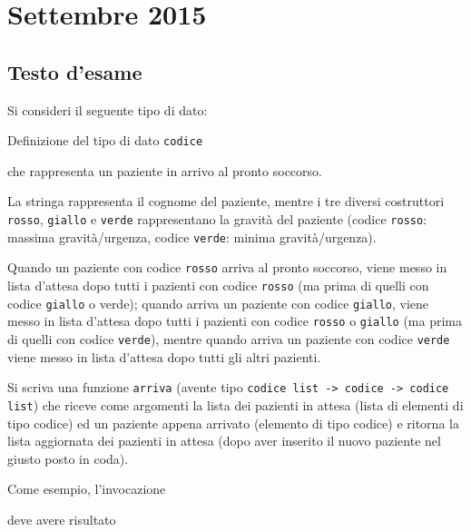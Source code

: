 \section{Settembre 2015}

\subsection{Testo d'esame}

Si consideri il seguente tipo di dato:

\begin{listing}[!h]
\caption[]{Definizione del tipo di dato \texttt{codice}}
\end{listing}
che rappresenta un paziente in arrivo al pronto soccorso.

\medskip
La stringa rappresenta il cognome del paziente, mentre i tre diversi costruttori \texttt{rosso}, \texttt{giallo} e \texttt{verde} rappresentano la gravità del paziente (codice \texttt{rosso}: massima gravità/urgenza, codice \texttt{verde}: minima gravità/urgenza).

\medskip
Quando un paziente con codice \texttt{rosso} arriva al pronto soccorso, viene messo in lista d'attesa dopo tutti i pazienti con codice \texttt{rosso} (ma prima di quelli con codice \texttt{giallo} o verde); quando arriva un paziente con codice \texttt{giallo}, viene messo in lista d'attesa dopo tutti i pazienti con codice \texttt{rosso} o \texttt{giallo} (ma prima di quelli con codice \texttt{verde}), mentre quando arriva un paziente con codice \texttt{verde} viene messo in lista d'attesa dopo tutti gli altri pazienti.

\medskip
Si scriva una funzione \texttt{arriva} (avente tipo \texttt{codice list -> codice -> codice list}) che riceve come argomenti la lista dei pazienti in attesa (lista di elementi di tipo codice) ed un paziente appena arrivato (elemento di tipo codice) e ritorna la lista aggiornata dei pazienti in attesa (dopo aver inserito il nuovo paziente nel giusto posto in coda).

\medskip
Come esempio, l'invocazione

\begin{smlcode}
arriva [rosso "topolino", rosso "cip", giallo "ciop", verde "paperino", verde "pluto"] (giallo "clarabella");}
\end{smlcode}

deve avere risultato

\begin{smlcode}
[rosso "topolino", rosso "cip", giallo "ciop", giallo "clarabella", verde "paperino", verde "pluto"]}
\end{smlcode}


